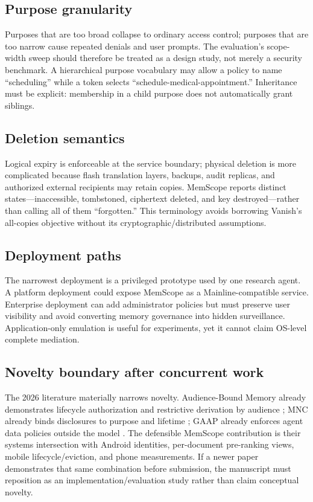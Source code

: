 \subsection{Purpose granularity}

Purposes that are too broad collapse to ordinary access control; purposes that are too narrow cause repeated denials and user prompts. The evaluation's scope-width sweep should therefore be treated as a design study, not merely a security benchmark. A hierarchical purpose vocabulary may allow a policy to name ``scheduling'' while a token selects ``schedule-medical-appointment.'' Inheritance must be explicit: membership in a child purpose does not automatically grant siblings.

\subsection{Deletion semantics}

Logical expiry is enforceable at the service boundary; physical deletion is more complicated because flash translation layers, backups, audit replicas, and authorized external recipients may retain copies. MemScope reports distinct states---inaccessible, tombstoned, ciphertext deleted, and key destroyed---rather than calling all of them ``forgotten.'' This terminology avoids borrowing Vanish's all-copies objective \citep{geambasu2009vanish} without its cryptographic/distributed assumptions.

\subsection{Deployment paths}

The narrowest deployment is a privileged prototype used by one research agent. A platform deployment could expose MemScope as a Mainline-compatible service. Enterprise deployment can add administrator policies but must preserve user visibility and avoid converting memory governance into hidden surveillance. Application-only emulation is useful for experiments, yet it cannot claim OS-level complete mediation.

\subsection{Novelty boundary after concurrent work}

The 2026 literature materially narrows novelty. Audience-Bound Memory already demonstrates lifecycle authorization and restrictive derivation by audience \citep{liu2026audience}; MNC already binds disclosures to purpose and lifetime \citep{xu2026mnc}; GAAP already enforces agent data policies outside the model \citep{stanley2026gaap}. The defensible MemScope contribution is their systems intersection with Android identities, per-document pre-ranking views, mobile lifecycle/eviction, and phone measurements. If a newer paper demonstrates that same combination before submission, the manuscript must reposition as an implementation/evaluation study rather than claim conceptual novelty.
